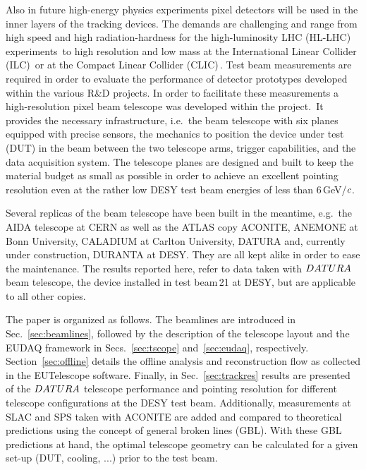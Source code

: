 

Also in future high-energy physics experiments pixel detectors will be used in the inner layers of the tracking devices. 
The demands are challenging and range from high speed and high radiation-hardness for the high-luminosity LHC (HL-LHC)
 experiments\,\cite{Nurnberg:2014aya, Garcia-Argos:2015zda} to high resolution and low mass at the International Linear Collider (ILC)\,\cite{ILC} or at the Compact Linear Collider (CLIC)\,\cite{CLIC}. 
Test beam measurements are required in order to evaluate the performance of detector prototypes developed within the various R\&D projects. 
In order to facilitate these measurements a high-resolution pixel beam telescope was developed within the \eudet project.\,\cite{ref:eudetreport200902}
It provides the necessary infrastructure, i.e.~the beam telescope with six planes equipped with precise \Mimosa sensors,
 the mechanics to position the device under test (DUT) in the beam between the two telescope arms, trigger capabilities, and the \eudaq data acquisition system. 
The telescope planes are designed and built to keep the material budget as small as possible in order to achieve an excellent pointing resolution
 even at the rather low DESY test beam energies of less than 6\,GeV/$\mathnormal{c}$.

Several replicas of the beam telescope have been built in the meantime, e.g.~the AIDA telescope at CERN as well as the ATLAS copy ACONITE, ANEMONE at Bonn University, CALADIUM at Carlton University, 
 DATURA and, currently under construction, DURANTA at DESY. 
They are all kept alike in order to ease the maintenance. 
The results reported here, refer to data taken with $DATURA$ beam telescope, the device installed in test beam\,21 at DESY, but are applicable to all other copies. 

The paper is organized as follows. 
The beamlines are introduced in Sec.~\ref{sec:beamlines}, followed by the description of the telescope layout and the EUDAQ framework in Secs.~\ref{sec:tscope} and~\ref{sec:eudaq}, respectively.
Section~\ref{sec:offline} details the offline analysis and reconstruction flow as collected in the EUTelescope software. 
Finally, in Sec.~\ref{sec:trackres} results are presented of the $DATURA$ telescope performance and pointing resolution for different telescope configurations at the DESY test beam. 
Additionally, measurements at SLAC and SPS taken with ACONITE are added and compared to theoretical predictions using the concept of general broken lines (GBL).
With these GBL predictions at hand, the optimal telescope geometry can be calculated for a given set-up (DUT, cooling, ...) prior to the test beam.
